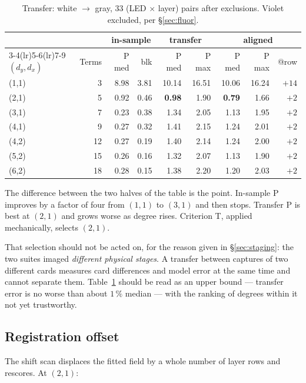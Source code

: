 \documentclass[11pt, a4paper]{article}
\newcommand{\pct}{\,\%}
\begin{document}
\begin{table}[htbp]
\centering
\caption{Transfer: white $\rightarrow$ gray,
33 (LED $\times$ layer) pairs after exclusions.
Violet excluded, per \S\ref{sec:fluor}.}
\label{tab:transfer}
\begin{tabular}{lrrrrrrrr}
\toprule
 & & \multicolumn{2}{c}{in-sample} & \multicolumn{2}{c}{transfer}
 & \multicolumn{3}{c}{aligned} \\
\cmidrule(lr){3-4}\cmidrule(lr){5-6}\cmidrule(lr){7-9}
$(d_y,d_x)$ & Terms & P med & blk & P med & P max & P med & P max & @row \\
\midrule
(1,1) &  3 & 8.98 & 3.81 & 10.14 & 16.51 & 10.06 & 16.24 & $+14$ \\
(2,1) &  5 & 0.92 & 0.46 & \textbf{0.98} & 1.90 & \textbf{0.79} & 1.66 & $+2$ \\
(3,1) &  7 & 0.23 & 0.38 & 1.34 & 2.05 & 1.13 & 1.95 & $+2$ \\
(4,1) &  9 & 0.27 & 0.32 & 1.41 & 2.15 & 1.24 & 2.01 & $+2$ \\
(4,2) & 12 & 0.27 & 0.19 & 1.40 & 2.14 & 1.24 & 2.00 & $+2$ \\
(5,2) & 15 & 0.26 & 0.16 & 1.32 & 2.07 & 1.13 & 1.90 & $+2$ \\
(6,2) & 18 & 0.28 & 0.15 & 1.38 & 2.20 & 1.20 & 2.03 & $+2$ \\
\bottomrule
\end{tabular}
\end{table}

The difference between the two halves of the table is the point.
In-sample P improves by a factor of four from $(1,1)$ to $(3,1)$
and then stops.
Transfer P is best at $(2,1)$ and grows worse as degree rises.
Criterion T, applied mechanically, selects $(2,1)$.

That selection should not be acted on,
for the reason given in \S\ref{sec:staging}:
the two suites imaged \emph{different physical stages}.
A transfer between captures of two different cards
measures card differences and model error at the same time
and cannot separate them.
Table~\ref{tab:transfer} should be read as an upper bound ---
transfer error is no worse than about $1\pct$ median ---
with the ranking of degrees within it not yet trustworthy.

\subsection{Registration offset}
\label{sec:registration}

The shift scan displaces the fitted field by a whole number of layer rows
and rescores.
At $(2,1)$:
\end{document}
